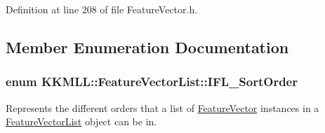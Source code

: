 Definition at line 208 of file Feature\+Vector.\+h.



\subsection{Member Enumeration Documentation}
\subsubsection[{\texorpdfstring{I\+F\+L\+\_\+\+Sort\+Order}{IFL_SortOrder}}]{\setlength{\rightskip}{0pt plus 5cm}enum {\bf K\+K\+M\+L\+L\+::\+Feature\+Vector\+List\+::\+I\+F\+L\+\_\+\+Sort\+Order}\hspace{0.3cm}{\ttfamily [strong]}}\hypertarget{class_k_k_m_l_l_1_1_feature_vector_list_a24e87fc6e8ca10537dbcd275bb339a3c}{}\label{class_k_k_m_l_l_1_1_feature_vector_list_a24e87fc6e8ca10537dbcd275bb339a3c}


Represents the different orders that a list of \hyperlink{class_k_k_m_l_l_1_1_feature_vector}{Feature\+Vector} instances in a \hyperlink{class_k_k_m_l_l_1_1_feature_vector_list}{Feature\+Vector\+List} object can be in. 

